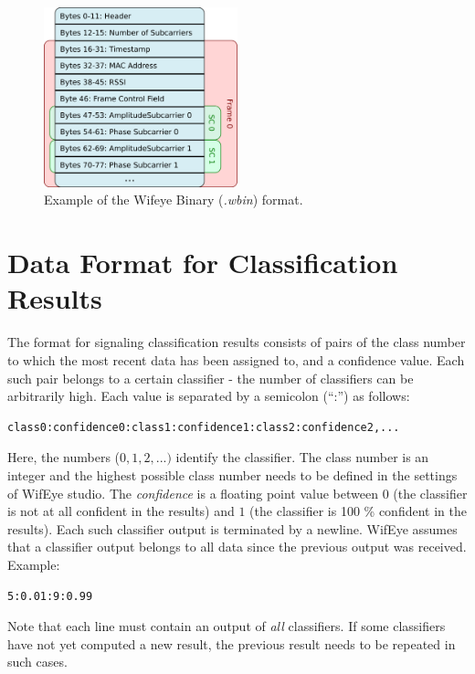 \documentclass{article}
\begin{document}
\begin{figure}
\centering
\vspace*{-.5cm}
\includegraphics[width=0.5\textwidth]{images/wbinformat.png}
\caption{Example of the Wifeye Binary (\textit{.wbin}) format.}
\label{fig:wbinformat}
\end{figure}

\section{Data Format for Classification Results}
The format for signaling classification results consists of pairs of the class number to which the most recent data has been assigned to, and a confidence value. Each such pair belongs to a certain classifier - the number of classifiers can be arbitrarily high. Each value is separated by a semicolon (``:'') as follows:
\begin{verbatim}
class0:confidence0:class1:confidence1:class2:confidence2,...
\end{verbatim}
Here, the numbers ($0,1,2,...)$ identify the classifier. 
The class number is an integer and the highest possible class number needs to be defined in the settings of WifEye studio. The \textit{confidence} is a floating point value between $0$ (the classifier is not at all confident in the results) and $1$ (the classifier is 100 \% confident in the results). Each such classifier output is terminated by a newline. WifEye assumes that a classifier output belongs to all data since the previous output was received.
Example:
\begin{verbatim}
5:0.01:9:0.99
\end{verbatim}
Note that each line must contain an output of \emph{all} classifiers. If some classifiers have not yet computed a new result, the previous result needs to be repeated in such cases. 
\end{document}
